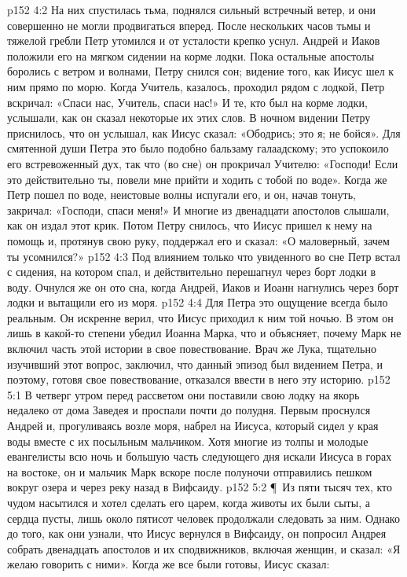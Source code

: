 \vs p152 4:2 На них спустилась тьма, поднялся сильный встречный ветер, и они совершенно не могли продвигаться вперед. После нескольких часов тьмы и тяжелой гребли Петр утомился и от усталости крепко уснул. Андрей и Иаков положили его на мягком сидении на корме лодки. Пока остальные апостолы боролись с ветром и волнами, Петру снился сон; видение того, как Иисус шел к ним прямо по морю. Когда Учитель, казалось, проходил рядом с лодкой, Петр вскричал: «Спаси нас, Учитель, спаси нас!» И те, кто был на корме лодки, услышали, как он сказал некоторые их этих слов. В ночном видении Петру приснилось, что он услышал, как Иисус сказал: «Ободрись; это я; не бойся». Для смятенной души Петра это было подобно бальзаму галаадскому; это успокоило его встревоженный дух, так что (во сне) он прокричал Учителю: «Господи! Если это действительно ты, повели мне прийти и ходить с тобой по воде». Когда же Петр пошел по воде, неистовые волны испугали его, и он, начав тонуть, закричал: «Господи, спаси меня!» И многие из двенадцати апостолов слышали, как он издал этот крик. Потом Петру снилось, что Иисус пришел к нему на помощь и, протянув свою руку, поддержал его и сказал: «О маловерный, зачем ты усомнился?»
\vs p152 4:3 Под влиянием только что увиденного во сне Петр встал с сидения, на котором спал, и действительно перешагнул через борт лодки в воду. Очнулся же он ото сна, когда Андрей, Иаков и Иоанн нагнулись через борт лодки и вытащили его из моря.
\vs p152 4:4 Для Петра это ощущение всегда было реальным. Он искренне верил, что Иисус приходил к ним той ночью. В этом он лишь в какой\hyp{}то степени убедил Иоанна Марка, что и объясняет, почему Марк не включил часть этой истории в свое повествование. Врач же Лука, тщательно изучивший этот вопрос, заключил, что данный эпизод был видением Петра, и поэтому, готовя свое повествование, отказался ввести в него эту историю.
\vs p152 5:1 В четверг утром перед рассветом они поставили свою лодку на якорь недалеко от дома Заведея и проспали почти до полудня. Первым проснулся Андрей и, прогуливаясь возле моря, набрел на Иисуса, который сидел у края воды вместе с их посыльным мальчиком. Хотя многие из толпы и молодые евангелисты всю ночь и большую часть следующего дня искали Иисуса в горах на востоке, он и мальчик Марк вскоре после полуночи отправились пешком вокруг озера и через реку назад в Вифсаиду.
\vs p152 5:2 \P\ Из пяти тысяч тех, кто чудом насытился и хотел сделать его царем, когда животы их были сыты, а сердца пусты, лишь около пятисот человек продолжали следовать за ним. Однако до того, как они узнали, что Иисус вернулся в Вифсаиду, он попросил Андрея собрать двенадцать апостолов и их сподвижников, включая женщин, и сказал: «Я желаю говорить с ними». Когда же все были готовы, Иисус сказал:

